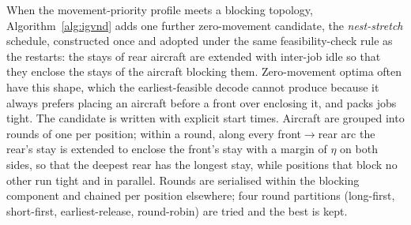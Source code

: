 When the movement-priority profile meets a blocking topology,
Algorithm~\ref{alg:igvnd} adds one further zero-movement candidate, the
\emph{nest-stretch} schedule, constructed once and adopted under the
same feasibility-check rule as the restarts: the stays of rear aircraft are
extended with inter-job idle so that they enclose the stays of the
aircraft blocking them.  Zero-movement optima often have this shape,
which the earliest-feasible decode cannot produce because it always
prefers placing an aircraft before a front over enclosing it, and packs
jobs tight.  The candidate is written with explicit start times.
Aircraft are grouped into rounds of one per position; within a round,
along every front$\to$rear arc the rear's stay is extended to enclose the
front's stay with a margin of $\eta$ on both sides, so that the deepest
rear has the longest stay, while positions that block no other run tight
and in parallel.  Rounds are serialised within the blocking component
and chained per position elsewhere; four round partitions (long-first,
short-first, earliest-release, round-robin) are tried and the best is
kept.
